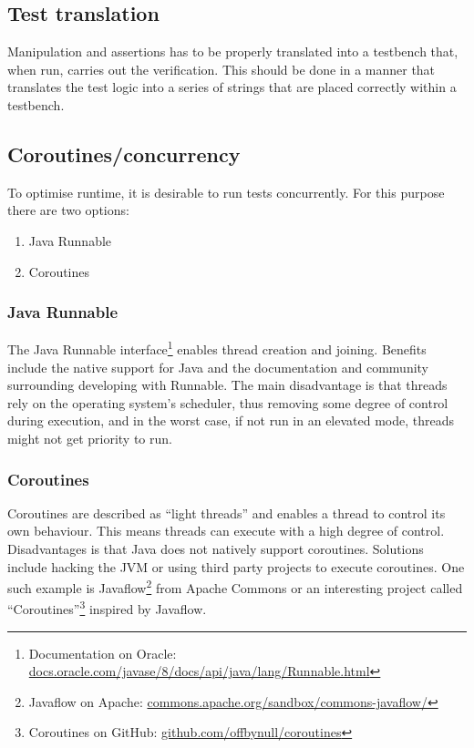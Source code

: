 \subsection{Test translation}
Manipulation and assertions has to be properly translated into a testbench that, when run, carries out the verification. This should be done in a manner that translates the test logic into a series of strings that are placed correctly within a testbench.
\subsection{Coroutines/concurrency}
To optimise runtime, it is desirable to run tests concurrently. For this purpose there are two options:
\begin{enumerate}
    \item Java Runnable
    \item Coroutines
\end{enumerate}
\subsubsection{Java Runnable}
The Java Runnable interface\footnote{Documentation on Oracle: \href{https://docs.oracle.com/javase/8/docs/api/java/lang/Runnable.html}{docs.oracle.com/javase/8/docs/api/java/lang/Runnable.html}} enables thread creation and joining. Benefits include the native support for Java and the documentation and community surrounding developing with Runnable. The main disadvantage is that threads rely on the operating system's scheduler, thus removing some degree of control during execution, and in the worst case, if not run in an elevated mode, threads might not get priority to run.
\subsubsection{Coroutines}
Coroutines are described as ``light threads'' and enables a thread to control its own behaviour. This means threads can execute with a high degree of control. Disadvantages is that Java does not natively support coroutines. Solutions include hacking the JVM or using third party projects to execute coroutines. One such example is Javaflow\footnote{Javaflow on Apache: \href{https://commons.apache.org/sandbox/commons-javaflow/}{commons.apache.org/sandbox/commons-javaflow/}} from Apache Commons or an interesting project called ``Coroutines''\footnote{Coroutines on GitHub: \href{https://github.com/offbynull/coroutines}{github.com/offbynull/coroutines}} inspired by Javaflow.
